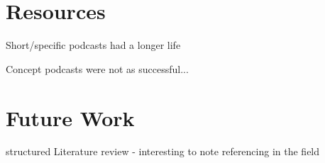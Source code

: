 \section{Resources} %
\label{sec:resources}

Short/specific podcasts had a longer life

Concept podcasts were not as successful... 



\section{Future Work} %
\label{sec:future_work}

structured Literature review - interesting to note referencing in the field


